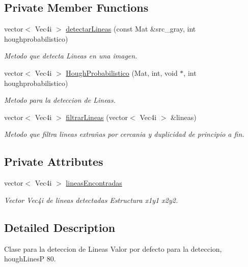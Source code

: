 \subsection*{Private Member Functions}
\begin{DoxyCompactItemize}
\item 
vector$<$ Vec4i $>$ \hyperlink{classCDetectarLineas_ae70b53c9bf1434cb25e267ea3ab62c63}{detectar\+Lineas} (const Mat \&src\+\_\+gray, int houghprobabilistico)
\begin{DoxyCompactList}\small\item\em Metodo que detecta Lineas en una imagen. \end{DoxyCompactList}\item 
vector$<$ Vec4i $>$ \hyperlink{classCDetectarLineas_ae99dee16338d0e71669d23208e4176de}{Hough\+Probabilistico} (Mat, int, void $\ast$, int houghprobabilistico)
\begin{DoxyCompactList}\small\item\em Metodo para la deteccion de Lineas. \end{DoxyCompactList}\item 
vector$<$ Vec4i $>$ \hyperlink{classCDetectarLineas_a89b7e5edd431909abd180f059f6abd0f}{filtrar\+Lineas} (vector$<$ Vec4i $>$ \&lineas)
\begin{DoxyCompactList}\small\item\em Metodo que filtra lineas extrañas por cercania y duplicidad de principio a fin. \end{DoxyCompactList}\end{DoxyCompactItemize}
\subsection*{Private Attributes}
\begin{DoxyCompactItemize}
\item 
vector$<$ Vec4i $>$ \hyperlink{classCDetectarLineas_a1aab2cfd627e2d3eef1650837ab61436}{lineas\+Encontradas}
\begin{DoxyCompactList}\small\item\em Vector Vec4i de lineas detectadas Estructura x1y1 x2y2. \end{DoxyCompactList}\end{DoxyCompactItemize}


\subsection{Detailed Description}
Clase para la deteccion de Lineas Valor por defecto para la deteccion, hough\+LinesP 80. 


